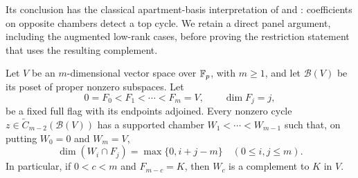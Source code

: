 Its conclusion has the classical apartment-basis interpretation of
\citet[Theorem~1]{Solomon1969} and
\citet[Proposition~4.5 and equation~(4.6)]{Bjorner1984}: coefficients
on opposite chambers detect a top cycle. We retain a direct panel
argument, including the augmented low-rank cases, before proving the
restriction statement that uses the resulting complement.

\begin{lemma}\label{lem:opposite-chamber}
Let $V$ be an $m$-dimensional vector space over $\mathbb F_p$, with
$m\geq1$, and let $\mathcal B(V)$ be its poset of proper nonzero
subspaces. Let
\[
 0=F_0<F_1<\cdots<F_m=V,\qquad \dim F_j=j,
\]
be a fixed full flag with its endpoints adjoined. Every nonzero
cycle $z\in\widetilde C_{m-2}(\mathcal B(V))$ has a supported
chamber $W_1<\cdots<W_{m-1}$ such that, on putting $W_0=0$
and $W_m=V$,
\begin{equation}\label{eq:chain-opposition}
 \dim(W_i\cap F_j)=\max\{0,i+j-m\}
       \quad(0\leq i,j\leq m).
\end{equation}
In particular, if $0<c<m$ and $F_{m-c}=K$, then
$W_c$ is a complement to $K$ in $V$.
\end{lemma}

